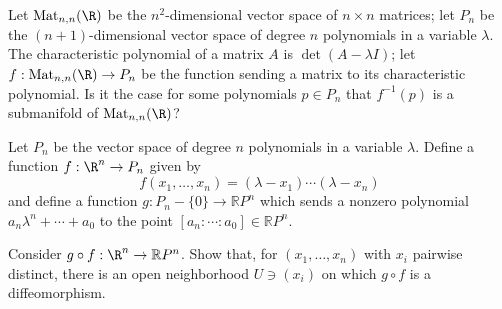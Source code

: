 \documentclass[12pt]{pset}
\newcommand{\RP}{\mathbb{R}P}
\DeclareMathOperator{\Mat}{Mat}
\begin{document}
\vfill

\begin{problem}

  Let $\Mat_{n,n}(\R)$ be the $n^2$-dimensional vector space of $n
  \times n$ matrices; let $P_n$ be the $(n+1)$-dimensional vector
  space of degree $n$ polynomials in a variable $\lambda$.  The
  characteristic polynomial of a matrix $A$ is $\det (A - \lambda I)$;
  let $f : \Mat_{n,n}(\R) \to P_n$ be the function sending a matrix to
  its characteristic polynomial.  Is it the case for some polynomials
  $p \in P_n$ that $f^{-1}(p)$ is a submanifold of $\Mat_{n,n}(\R)$?

\end{problem}

\vfill

\begin{problem}

  Let $P_{n}$ be the vector space of degree $n$ polynomials in a
  variable $\lambda$.  Define a function $f : \R^n \to P_{n}$ given
  by
$$
f(x_1,\ldots,x_n) = (\lambda - x_1) \cdots (\lambda - x_n)
$$
and define a function $g : P_{n} - \{0\} \to \RP^{n}$ which sends a
nonzero polynomial $a_n \lambda^n + \cdots + a_0$ to the point $[a_n :
\cdots : a_0] \in \RP^n$.

Consider $g \circ f : \R^n \to \RP^n$.  Show that, for
$(x_1,\ldots,x_n)$ with $x_i$ pairwise distinct, there is an open
neighborhood $U \ni (x_i)$ on which $g \circ f$ is a diffeomorphism.
  
\end{problem}

\vfill
\end{document}
